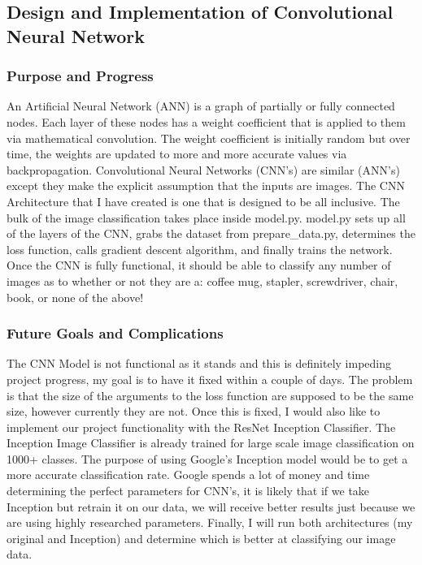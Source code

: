 \documentclass[draftclsnofoot, onecolumn, 10pt, compsoc]{IEEEtran}
\begin{document}
\subsection{Design and Implementation of Convolutional Neural Network}

\subsubsection{Purpose and Progress}
An Artificial Neural Network (ANN) is a graph of partially or fully connected nodes. Each layer of these nodes has a weight coefficient that is applied to them via mathematical convolution. The weight coefficient is initially random but over time, the weights are updated to more and more accurate values via backpropagation. Convolutional Neural Networks (CNN's) are similar (ANN's) except they make the explicit assumption that the inputs are images. \cite{CNN} The CNN Architecture that I have created is one that is designed to be all inclusive. The bulk of the image classification takes place inside model.py. model.py sets up all of the layers of the CNN, grabs the dataset from prepare\_data.py, determines the loss function, calls gradient descent algorithm, and finally trains the network. Once the CNN is fully functional, it should be able to classify any number of images as to whether or not they are a: coffee mug, stapler, screwdriver, chair, book, or none of the above!
\subsubsection{Future Goals and Complications}
The CNN Model is not functional as it stands and this is definitely impeding project progress, my goal is to have it fixed within a couple of days. The problem is that the size of the arguments to the loss function are supposed to be the same size, however currently they are not. Once this is fixed, I would also like to implement our project functionality with the ResNet Inception Classifier. The Inception Image Classifier is already trained for large scale image classification on 1000+ classes. \cite{Inception} The purpose of using Google's Inception model would be to get a more accurate classification rate. Google spends a lot of money and time determining the perfect parameters for CNN's, it is likely that if we take Inception but retrain it on our data, we will receive better results just because we are using highly researched parameters. Finally, I will run both architectures (my original and Inception) and determine which is better at classifying our image data.
\end{document}
